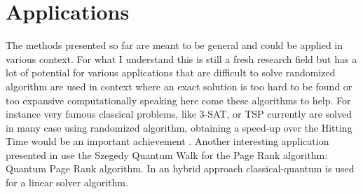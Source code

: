 \section{Applications}

The methods presented so far are meant to be general and could be applied in various context. For what I understand this is still a fresh research field 
but has a lot of potential for various applications that are difficult to solve randomized algorithm are used in context where an exact solution is too
hard to be found or too expansive computationally speaking here come these algorithms to help. For instance very famous classical problems, like 3-SAT, 
or TSP currently are solved in many case using randomized algorithm, obtaining a speed-up over the Hitting Time would be an important achievement \cite{Kempe_2003}. 
Another interesting application presented in \cite{Loke_2017} use the Szegedy Quantum Walk for the Page Rank algorithm: Quantum Page Rank algorithm. 
In \cite{Chen2019} an hybrid approach classical-quantum is used for a linear solver algorithm.


